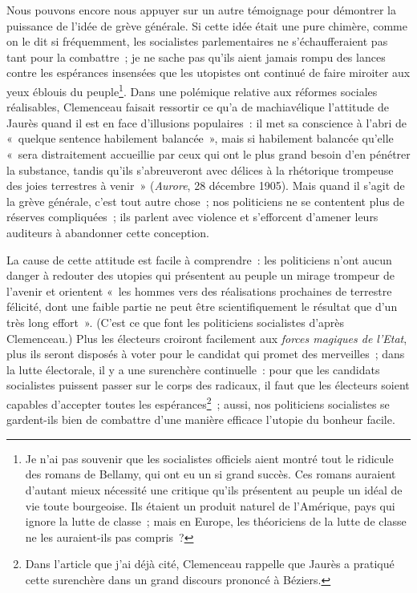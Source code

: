 \documentclass[french,twoside]{book} %
\begin{document}
\noindent Nous pouvons encore nous appuyer sur un autre témoignage pour démontrer la puissance de l’idée de grève générale. Si cette idée était une pure chimère, comme on le dit si fréquemment, les socialistes parlementaires ne s’échaufferaient pas tant pour la combattre ; je ne sache pas qu’ils aient jamais rompu des lances contre les espérances insensées que les utopistes ont continué de faire miroiter aux yeux éblouis du peuple\footnote{ \noindent Je n’ai pas souvenir que les socialistes officiels aient montré tout le ridicule des romans de Bellamy, qui ont eu un si grand succès. Ces romans auraient d’autant mieux nécessité une critique qu’ils présentent au peuple un idéal de vie toute bourgeoise. Ils étaient un produit naturel de l’Amérique, pays qui ignore la lutte de classe ; mais en Europe, les théoriciens de la lutte de classe ne les auraient-ils pas compris ?
 }. Dans une  polémique relative aux réformes sociales réalisables, Clemenceau faisait ressortir ce qu’a de machiavélique l’attitude de Jaurès quand il est en face d’illusions populaires : il met sa conscience à l’abri de « quelque sentence habilement balancée », mais si habilement balancée qu’elle « sera distraitement accueillie par ceux qui ont le plus grand besoin d’en pénétrer la substance, tandis qu’ils s’abreuveront avec délices à la rhétorique trompeuse des joies terrestres à venir » (\emph{Aurore}, 28 décembre 1905). Mais quand il s’agit de la grève générale, c’est tout autre chose ; nos politiciens ne se contentent plus de réserves compliquées ; ils parlent avec violence et s’efforcent d’amener leurs auditeurs à abandonner cette conception.\par
La cause de cette attitude est facile à comprendre : les politiciens n’ont aucun danger à redouter des utopies qui présentent au peuple un mirage trompeur de l’avenir et orientent « les hommes vers des réalisations prochaines de terrestre félicité, dont une faible partie ne peut être scientifiquement le résultat que d’un très long effort ». (C’est ce que font les politiciens socialistes d’après Clemenceau.) Plus les électeurs croiront facilement aux \emph{forces magiques de l’Etat}, plus ils seront disposés à voter pour le candidat qui promet des merveilles ; dans la lutte  électorale, il y a une surenchère continuelle : pour que les candidats socialistes puissent passer sur le corps des radicaux, il faut que les électeurs soient capables d’accepter toutes les espérances\footnote{ \noindent Dans l’article que j’ai déjà cité, Clemenceau rappelle que Jaurès a pratiqué cette surenchère dans un grand discours prononcé à Béziers.
 } ; aussi, nos politiciens socialistes se gardent-ils bien de combattre d’une manière efficace l’utopie du bonheur facile.\par
\end{document}
